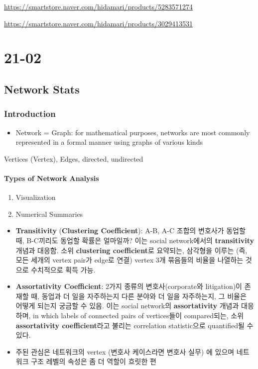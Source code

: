 \documentclass[
]{book}
\providecommand{\tightlist}{%
  \setlength{\itemsep}{0pt}\setlength{\parskip}{0pt}}
\begin{document}
{{{\url{https://smartstore.naver.com/hidamari/products/5283571274}

\url{https://smartstore.naver.com/hidamari/products/3029413531}

\hypertarget{part-21-02}{%
\part{21-02}\label{part-21-02}}

\hypertarget{network-stats}{%
\chapter{Network Stats}\label{network-stats}}

\hypertarget{introduction-2}{%
\section{Introduction}\label{introduction-2}}

\begin{itemize}
\tightlist
\item
  Network = Graph: for mathematical purposes, networks are most commonly represented in a formal manner using graphs of various kinds
\end{itemize}

Vertices (Vertex), Edges, directed, undirected

\hypertarget{types-of-network-analysis}{%
\subsection{Types of Network Analysis}\label{types-of-network-analysis}}

\begin{enumerate}
\def\labelenumi{\arabic{enumi}.}
\item
  Visualization
\item
  Numerical Summaries
\end{enumerate}

\begin{itemize}
\item
  \textbf{Transitivity} (\textbf{Clustering Coefficient}): A-B, A-C 조합의 변호사가 동업할 때, B-C끼리도 동업할 확률은 얼마일까? 이는 social network에서의 \textbf{transitivity} 개념과 대응함. 소위 \textbf{clustering coefficient}로 요약되는, 삼각형을 이루는 (즉, 모든 세개의 vertex pair가 edge로 연결) vertex 3개 묶음들의 비율을 나열하는 것으로 수치적으로 획득 가능.
\item
  \textbf{Assortativity Coefficient}: 2가지 종류의 변호사(corporate와 litigation)이 존재할 때, 동업과 더 일을 자주하는지 다른 분야와 더 일을 자주하는지, 그 비율은 어떻게 되는지 궁금할 수 있음. 이는 social network의 \textbf{assortativity} 개념과 대응하며, in which labels of connected pairs of vertices들이 compared되는, 소위 \textbf{assortativity coefficient}라고 불리는 correlation statistic으로 quantified될 수 있다.
\item
  주된 관심은 네트워크의 vertex (변호사 케이스라면 변호사 실무) 에 있으며 네트워크 구조 레벨의 속성은 좀 더 역할이 흐릿한 편
\end{itemize}

}}}
\end{document}
